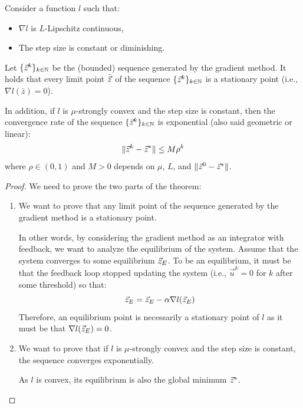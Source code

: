 \begin{theorem} 
    Consider a function $l$ such that:
    \begin{itemize}
        \item $\nabla l$ is $L$-Lipschitz continuous,
        \item The step size is constant or diminishing. 
    \end{itemize}
    Let $\{ {\vec{z}}^k \}_{k \in \mathbb{N}}$ be the (bounded) sequence generated by the gradient method. It holds that every limit point $\bar{{\vec{z}}}$ of the sequence $\{ {\vec{z}}^k \}_{k \in \mathbb{N}}$ is a stationary point (i.e., $\nabla l(\bar{z}) = 0$).

    In addition, if $l$ is $\mu$-strongly convex and the step size is constant, then the convergence rate of the sequence $\{ {\vec{z}}^k \}_{k \in \mathbb{N}}$ is exponential (also said geometric or linear):
    \[
        \Vert {\vec{z}}^k - {\vec{z}}^* \Vert \leq M \rho^k
    \]
    where $\rho \in (0, 1)$ and $M > 0$ depends on $\mu$, $L$, and $\Vert {\vec{z}}^0 - {\vec{z}}^* \Vert$.

    \begin{proof}
        We need to prove the two parts of the theorem:
        \begin{enumerate}
            \item 
                We want to prove that any limit point of the sequence generated by the gradient method is a stationary point.

                In other words, by considering the gradient method as an integrator with feedback, we want to analyze the equilibrium of the system. Assume that the system converges to some equilibrium ${\vec{z}}_E$. To be an equilibrium, it must be that the feedback loop stopped updating the system (i.e., $\vec{u}^k = 0$ for $k$ after some threshold) so that:
                \[
                    {\vec{z}}_E = {\vec{z}}_E - \alpha \nabla l({\vec{z}}_E)
                \]
                Therefore, an equilibrium point is necessarily a stationary point of $l$ as it must be that $\nabla l({\vec{z}}_E) = 0$.
            
            \item 
                We want to prove that if $l$ is $\mu$-strongly convex and the step size is constant, the sequence converges exponentially.

                \begin{remark}
                    As $l$ is convex, its equilibrium is also the global minimum ${\vec{z}}^*$.
                \end{remark}


\end{enumerate}
\end{proof}
\end{theorem}
